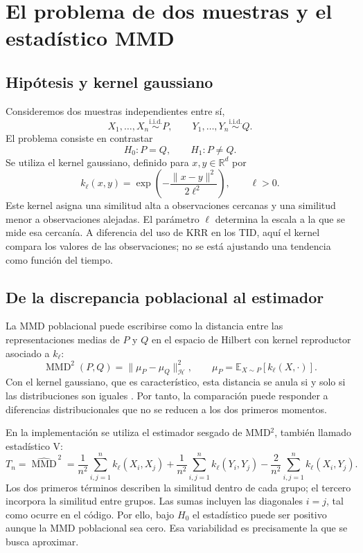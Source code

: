 \documentclass[11pt,a4paper]{article}
\newcommand{\MMD}{\operatorname{MMD}}
\newcommand{\E}{\mathbb{E}}
\newcommand{\R}{\mathbb{R}}
\begin{document}
\section{El problema de dos muestras y el estadístico MMD}
\subsection{Hipótesis y kernel gaussiano}
Consideremos dos muestras independientes entre sí,
\[
X_1,\ldots,X_n\overset{\mathrm{i.i.d.}}{\sim}P,
\qquad
Y_1,\ldots,Y_n\overset{\mathrm{i.i.d.}}{\sim}Q.
\]
El problema consiste en contrastar
\begin{equation}
H_0:P=Q,\qquad H_1:P\neq Q.
\end{equation}
Se utiliza el kernel gaussiano, definido para $x,y\in\R^d$ por
\begin{equation}\label{eq:kernel}
k_\ell(x,y)=\exp\left(-\frac{\|x-y\|^2}{2\ell^2}\right),\qquad \ell>0.
\end{equation}
Este kernel asigna una similitud alta a observaciones cercanas y una similitud menor a observaciones alejadas. El parámetro $\ell$ determina la escala a la que se mide esa cercanía. A diferencia del uso de KRR en los TID, aquí el kernel compara los valores de las observaciones; no se está ajustando una tendencia como función del tiempo.

\subsection{De la discrepancia poblacional al estimador}
La MMD poblacional puede escribirse como la distancia entre las representaciones medias de $P$ y $Q$ en el espacio de Hilbert con kernel reproductor asociado a $k_\ell$:
\begin{equation}
\MMD^2(P,Q)=\|\mu_P-\mu_Q\|_{\mathcal H}^2,
\qquad \mu_P=\E_{X\sim P}[k_\ell(X,\cdot)].
\end{equation}
Con el kernel gaussiano, que es característico, esta distancia se anula si y solo si las distribuciones son iguales \cite{gretton2012}. Por tanto, la comparación puede responder a diferencias distribucionales que no se reducen a los dos primeros momentos.

En la implementación se utiliza el estimador sesgado de MMD$^2$, también llamado estadístico V:
\begin{equation}\label{eq:mmd}
T_n=\widehat{\MMD}^{\,2}
=\frac{1}{n^2}\sum_{i,j=1}^{n}k_\ell(X_i,X_j)
+\frac{1}{n^2}\sum_{i,j=1}^{n}k_\ell(Y_i,Y_j)
-\frac{2}{n^2}\sum_{i,j=1}^{n}k_\ell(X_i,Y_j).
\end{equation}
Los dos primeros términos describen la similitud dentro de cada grupo; el tercero incorpora la similitud entre grupos. Las sumas incluyen las diagonales $i=j$, tal como ocurre en el código. Por ello, bajo $H_0$ el estadístico puede ser positivo aunque la MMD poblacional sea cero. Esa variabilidad es precisamente la que se busca aproximar.
\end{document}
